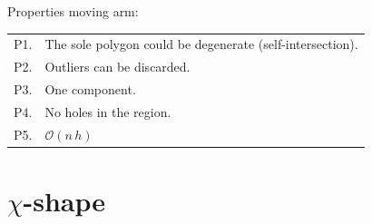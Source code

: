 Properties moving arm:
\\
\begin{tabular}{@{}ll@{}}
\toprule
  P1. & The sole polygon could be degenerate (self-intersection).  \\  
  P2. & Outliers can be discarded. \\  %
  P3. & One component.  \\ 
  P4. & No holes in the region.  \\  
  P5. & $\mathcal{O}(n \, h)$  \\  
\bottomrule
\end{tabular}



%
\section{$\chi$-shape}

